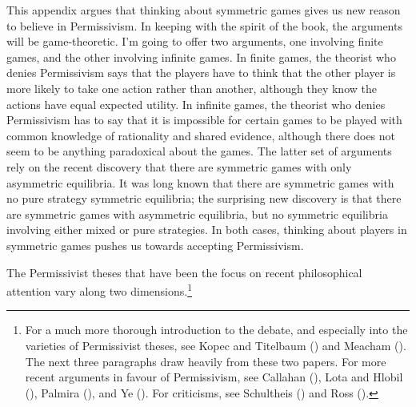 \documentclass[
  12pt,
  letterpaper,
  DIV=11,
  numbers=noendperiod]{scrreprt}
\begin{document}
This appendix argues that thinking about symmetric games gives us new
reason to believe in Permissivism. In keeping with the spirit of the
book, the arguments will be game-theoretic. I'm going to offer two
arguments, one involving finite games, and the other involving infinite
games. In finite games, the theorist who denies Permissivism says that
the players have to think that the other player is more likely to take
one action rather than another, although they know the actions have
equal expected utility. In infinite games, the theorist who denies
Permissivism has to say that it is impossible for certain games to be
played with common knowledge of rationality and shared evidence,
although there does not seem to be anything paradoxical about the games.
The latter set of arguments rely on the recent discovery that there are
symmetric games with only asymmetric equilibria. It was long known that
there are symmetric games with no pure strategy symmetric equilibria;
the surprising new discovery is that there are symmetric games with
asymmetric equilibria, but no symmetric equilibria involving either
mixed or pure strategies. In both cases, thinking about players in
symmetric games pushes us towards accepting Permissivism.

The Permissivist theses that have been the focus on recent philosophical
attention vary along two dimensions.\footnote{For a much more thorough
  introduction to the debate, and especially into the varieties of
  Permissivist theses, see Kopec and Titelbaum
  () and Meacham
  (). The next three paragraphs draw
  heavily from these two papers. For more recent arguments in favour of
  Permissivism, see Callahan (), Lota
  and Hlobil (), Palmira
  (), and Ye
  (). For criticisms, see Schultheis
  () and Ross
  ().}
\end{document}
